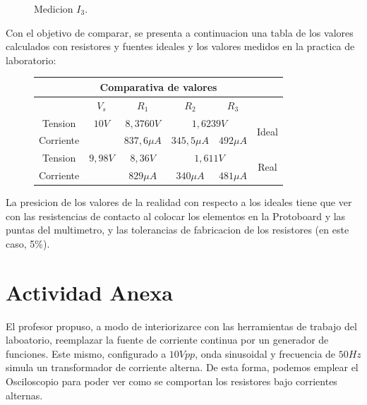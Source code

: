 \documentclass[a4paper,12pt, spanish]{report}
\newcommand\myemptypage{
  \newpage
  \null
  \thispagestyle{empty}
  \addtocounter{page}{-1}
  \newpage
}
\begin{document}
\begin{figure}[H]
\begin{minipage}{0.3\textwidth}
            \caption{Medicion $I_3$.}
          \end{minipage}
      \end{figure}


      Con el objetivo de comparar, se presenta a continuacion una tabla de los valores calculados con resistores y
      fuentes ideales y los valores medidos en la practica de laboratorio:
      \begin{figure}[!h]
        \centering
        \begin{tabular}[c]{|c||c|c|c|c||c|}
          \hline
          \multicolumn{6}{|c|}{Comparativa de valores}\\
          \hline
                    & $V_s$         & $R_1$         & $R_2$         & $R_3$         & \\
          \hline
          Tension   & $10V$         & $8,3760V$     & \multicolumn{2}{|c||}{$1,6239V$} & \multirow{2}{*}{Ideal}\\
          \cline{1-5}
          Corriente &               & $837,6\mu A$  & $345,5\mu A$  & $492\mu A$    & \\
          \hline
          Tension   & $9,98V$       & $8,36V$       & \multicolumn{2}{|c||}{$1,611V$}  & \multirow{2}{*}{Real}\\
          \cline{1-5}
          Corriente &               & $829\mu A$    & $340\mu A$    & $481\mu A$    & \\
          \hline
        \end{tabular}
      \end{figure}
      
      La presicion de los valores de la realidad con respecto a los ideales tiene que ver con las resistencias de
      contacto al colocar los elementos en la Protoboard y las puntas del multimetro, y las tolerancias de fabricacion
      de los resistores (en este caso, 5\%).

    \myemptypage
    \chapter{Actividad Anexa}
      El profesor propuso, a modo de interiorizarce con las herramientas de trabajo del laboatorio, reemplazar la
      fuente de corriente continua por un generador de funciones. Este mismo, configurado a $10Vpp$, onda sinusoidal y
      frecuencia de $50Hz$ simula un transformador de corriente alterna. De esta forma, podemos emplear el Osciloscopio
      para poder ver como se comportan los resistores bajo corrientes alternas.
\end{document}
